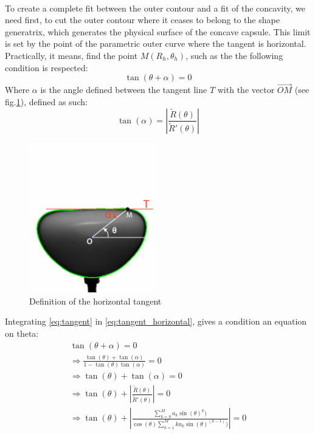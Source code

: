 \paragraph{}
To create a complete fit between the outer contour and a fit of the concavity, we need first, to cut the outer contour where it ceases to belong to the shape generatrix, which generates the physical surface of the concave capsule. This limit is set by the point of the parametric outer curve where the tangent is horizontal.
Practically, it means, find the point $M(R_{h},\theta_h)$, such as the the following condition is respected:
\begin{equation}
	\tan(\theta+\alpha) =0
	\label{eq:tangent_horizontal}
\end{equation}
Where $\alpha$ is the angle defined between the tangent line $T$ with the vector $\vec{OM}$ (see fig.\ref{fig:Illustration_tangent}), defined as such:
\begin{equation}
	\tan(\alpha) =|{\frac {\tilde{R}(\theta )}{\tilde{R}'(\theta )}}|
	\label{eq:tangent}
\end{equation}
\begin{figure}[H] %
	\centering%
  \includegraphics[width=0.48\textwidth]{figures/Chapter_1/tan_alpha.png}
	\caption{Definition of the horizontal tangent}
	\label{fig:Illustration_tangent}
\end{figure}
Integrating \eqref{eq:tangent} in \eqref{eq:tangent_horizontal}, gives a condition an equation on theta:
	\begin{gather*}
		\tan(\theta+\alpha) =0\\
		\Rightarrow\frac{\tan(\theta)+\tan(\alpha)}{1-\tan(\theta)\tan(\alpha)} = 0\\
		\Rightarrow\tan(\theta)+\tan(\alpha) = 0\\
		\Rightarrow\tan(\theta)+|{\frac {\tilde{R}(\theta )}{\tilde{R}'(\theta )}}|=0\\
		\Rightarrow\tan(\theta)+|{\frac {\sum\limits_{k=0}^M a_k \sin(\theta)^k  )}{\cos(\theta) \sum\limits_{k=1}^M k a_k \sin(\theta)^{(k-1)} )}}|=0
	\end{gather*}
